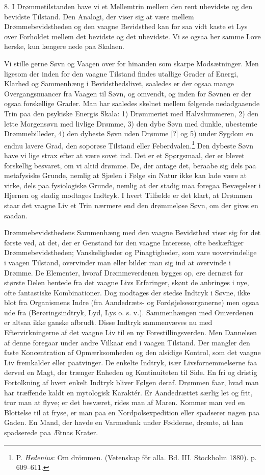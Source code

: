 \documentclass[12pt,a4paper,openany]{book}
\newcommand{\opage}[1]{\marginnote{\footnotesize\textit{[#1]}}}
\begin{document}
8. I Drømmetilstanden have vi et Mellemtrin mellem den rent ubevidste og
den bevidste Tilstand. Den Analogi, der viser sig at være mellem
Drømmebevidstheden og den vaagne Bevidsthed kan for saa vidt kaste et
Lys over Forholdet mellem det bevidste og det ubevidste. Vi se ogsaa her
samme Love herske, kun længere nede paa Skalaen.

Vi stille gerne Søvn og Vaagen over for hinanden som skarpe
Modsætninger. Men ligesom der inden for den vaagne Tilstand findes
utallige Grader af Energi, Klarhed og Sammenhæng i Bevidsthedslivet,
saaledes er der ogsaa mange Overgangsnuancer fra Vaagen til Søvn, og
omvendt, og inden for Søvnen er der ogsaa forskellige Grader. Man har
saaledes skelnet mellem følgende nedadgaaende Trin paa den psykiske
Energis Skala: 1) Drømmeriet med Halvslummeren, 2) den lette Morgensøvn
med livlige Drømme, 3) den dybe Søvn med dunkle, ubestemte
Drømmebilleder, 4) den dybeste Søvn uden Drømme [?] og 5) under Sygdom
en endnu lavere Grad, den soporøse Tilstand eller
Feberdvalen.\footnote[2]{P. \emph{Hedenius}: Om drömmen. (Vetenskap för
alla. Bd. III. Stockholm 1880). p. 609--611.} Den dybeste Søvn
\opage{94}have vi lige strax efter at være sovet ind. Det er et
Spørgsmaal, der er blevet forskellig besvaret, om vi altid drømme. De,
der antage det, beraabe sig dels paa metafysiske Grunde, nemlig at
Sjælen i Følge sin Natur ikke kan lade være at virke, dels paa
fysiologiske Grunde, nemlig at der stadig maa foregaa Bevægelser i
Hjernen og stadig modtages Indtryk. I hvert Tilfælde er det klart, at
Drømmen staar det vaagne Liv et Trin nærmere end den drømmeløse Søvn, om
der gives en saadan.

Drømmebevidsthedens Sammenhæng med den vaagne Bevidsthed viser sig for
det første ved, at det, der er Genstand for den vaagne Interesse, ofte
beskæftiger Drømmebevidstheden; Vanskeligheder og Pinagtigheder, som
vare uovervindelige i vaagen Tilstand, overvinder man eller bilder man
sig ind at overvinde i Drømme. De Elementer, hvoraf Drømmeverdenen
bygges op, ere dernæst for største Delen hentede fra det vaagne Livs
Erfaringer, skønt de anbringes i nye, ofte fantastiske Kombinationer.
Dog modtages der stedse Indtryk i Søvne, ikke blot fra Organismens Indre
(fra Aandedræts- og Fordøjelsesorganerne) men ogsaa ude fra
(Berøringsindtryk, Lyd, Lys o. s. v.). Sammenhængen med Omverdenen er
altsaa ikke ganske afbrudt. Disse Indtryk sammenvæves nu med
Eftervirkningerne af det vaagne Liv til en ny Forestillingsverden. Men
Dannelsen af denne foregaar under andre Vilkaar end i vaagen Tilstand.
Der mangler den faste Koncentration af Opmærksomheden og den alsidige
Kontrol, som det vaagne Liv fremkalder eller paatvinger. De enkelte
Indtryk, især Livsfornemmelserne faa derved en Magt, der trænger Enheden
og Kontinuiteten til Side. En fri og dristig Fortolkning af hvert enkelt
Indtryk bliver Følgen deraf. Drømmen faar, hvad man har træffende kaldt
en mytologisk Karaktér. Er Aandedrættet særlig let og frit, tror man at
flyve; er det besværet, rides man af Maren. Kommer man ved en Blottelse
til at fryse, er man paa en Nordpolsexpedition eller spadserer nøgen paa
Gaden. En Mand, der havde en Varmedunk under Fødderne, drømte, at han
spadserede paa Ætnas Krater.
\end{document}
